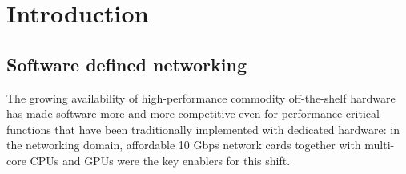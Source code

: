 \documentclass[11pt,a4paper,twoside,titlepage,openany]{book}
\begin{document}






\chapter{Introduction}


\section{Software defined networking}
The growing availability of high-performance commodity off-the-shelf %
hardware has made software more and more competitive even for performance-critical functions that have been traditionally implemented with dedicated hardware: in the networking domain, affordable 10 Gbps network cards together with multi-core CPUs and GPUs were the key enablers for this shift.
\end{document}
